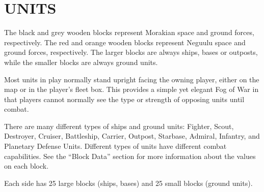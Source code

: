 \section{UNITS}
The black and grey wooden blocks represent Morakian space and ground forces, respectively. The red and orange wooden blocks represent Neguulu space and ground forces, respectively. The larger blocks are always ships, bases or outposts, while the smaller blocks are always ground units.

Most units in play normally stand upright facing the owning player, either on the map or in the player’s fleet box. This provides a simple yet elegant Fog of War in that players cannot normally see the type or strength of opposing units until combat.

There are many different types of ships and ground units: Fighter, Scout, Destroyer, Cruiser, Battleship, Carrier, Outpost, Starbase, Admiral, Infantry, and Planetary Defense Units. Different types of units have different combat capabilities. See the “Block Data” section for more information about the values on each block.

Each side has 25 large blocks (ships, bases) and 25 small blocks (ground units).